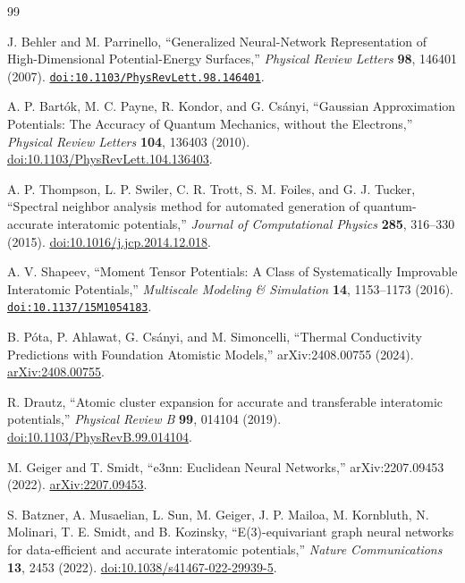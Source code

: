 \documentclass[aps,prx,preprint,notitlepage,superscriptaddress,nofootinbib,floatfix]{revtex4-2}
\newif\ifshowrevisions
\newcommand{\draftfourteen}[1]{%
  \ifshowrevisions\textcolor{draftfourteencolor}{#1}\else#1\fi}
\begin{document}
\makeatletter
\let\auto@bib@innerbib\@empty
\makeatother
\begin{thebibliography}{99}
\raggedright

J. Behler and M. Parrinello,
``Generalized Neural-Network Representation of High-Dimensional Potential-Energy
Surfaces,'' \emph{Physical Review Letters} \textbf{98}, 146401 (2007).
\href{https://doi.org/10.1103/PhysRevLett.98.146401}{\nolinkurl{doi:10.1103/PhysRevLett.98.146401}}.

A. P. Bart{\'o}k, M. C. Payne, R. Kondor, and G. Cs{\'a}nyi,
``Gaussian Approximation Potentials: The Accuracy of Quantum Mechanics, without
the Electrons,'' \emph{Physical Review Letters} \textbf{104}, 136403 (2010).
\href{https://doi.org/10.1103/PhysRevLett.104.136403}{doi:10.1103/PhysRevLett.104.136403}.

A. P. Thompson, L. P. Swiler, C. R. Trott, S. M. Foiles, and G. J. Tucker,
``Spectral neighbor analysis method for automated generation of quantum-accurate
interatomic potentials,'' \emph{Journal of Computational Physics} \textbf{285},
316--330 (2015).
\href{https://doi.org/10.1016/j.jcp.2014.12.018}{doi:10.1016/j.jcp.2014.12.018}.

A. V. Shapeev,
``Moment Tensor Potentials: A Class of Systematically Improvable Interatomic
Potentials,'' \emph{Multiscale Modeling \& Simulation} \textbf{14}, 1153--1173
(2016).
\href{https://doi.org/10.1137/15M1054183}{\nolinkurl{doi:10.1137/15M1054183}}.

\draftfourteen{B. P{\'o}ta, P. Ahlawat, G. Cs{\'a}nyi, and M. Simoncelli,
``Thermal Conductivity Predictions with Foundation Atomistic Models,''
arXiv:2408.00755 (2024).
\href{https://arxiv.org/abs/2408.00755}{arXiv:2408.00755}.}

R. Drautz,
``Atomic cluster expansion for accurate and transferable interatomic
potentials,'' \emph{Physical Review B} \textbf{99}, 014104 (2019).
\href{https://doi.org/10.1103/PhysRevB.99.014104}{doi:10.1103/PhysRevB.99.014104}.


M. Geiger and T. Smidt,
``e3nn: Euclidean Neural Networks,'' arXiv:2207.09453 (2022).
\href{https://arxiv.org/abs/2207.09453}{arXiv:2207.09453}.

S. Batzner, A. Musaelian, L. Sun, M. Geiger, J. P. Mailoa, M. Kornbluth,
N. Molinari, T. E. Smidt, and B. Kozinsky,
``E(3)-equivariant graph neural networks for data-efficient and accurate
interatomic potentials,'' \emph{Nature Communications} \textbf{13}, 2453
(2022).
\href{https://doi.org/10.1038/s41467-022-29939-5}{doi:10.1038/s41467-022-29939-5}.


\end{thebibliography}
\end{document}

